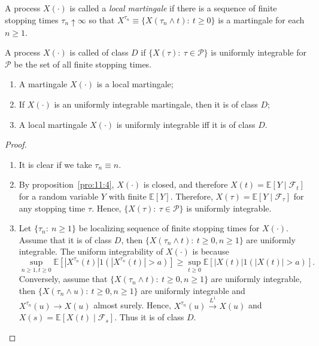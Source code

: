 \begin{definition}
A process $X(\cdot)$ is called a \emph{local martingale} if
there is a sequence of finite stopping times $\tau_n\uparrow \infty$ so that 
$X^{\tau_n}\equiv\{X(\tau_n\land t):~t\ge0\}$ is a martingale for each $n\ge1$.
\end{definition}

\begin{definition}[Class D]
A process $X(\cdot)$ is called of class $D$ if $\{X(\tau):~\tau\in\mathcal{P}\}$
is uniformly integrable for $\mathcal{P}$ be the set of all finite stopping times.
\end{definition}

\begin{proposition}
\begin{enumerate}
\item
A martingale $X(\cdot)$ is a local martingale;
\item
If $X(\cdot)$ is an uniformly integrable martingale, then it is of class $D$;
\item
A local martingale $X(\cdot)$ is uniformly integrable iff it is of class $D$.
\end{enumerate}
\end{proposition}
\begin{proof}
\begin{enumerate}
\item
It is clear if we take $\tau_n\equiv n$.
\item
By proposition~\ref{pro:11:4}, $X(\cdot)$ is closed, and therefore $X(t)=\mathbb{E}[Y\mid\mathcal{F}_t]$ for a random variable $Y$ with finite $\mathbb{E}[Y]$. 
Therefore, $X(\tau)=\mathbb{E}[Y\mid\mathcal{F}_{\tau}]$ for any stopping time $\tau$.
Hence, $\{X(\tau):~\tau\in\mathcal{P}\}$ is uniformly integrable.
\item
Let $\{\tau_n:~n\ge1\}$ be localizing sequence of finite stopping times for $X(\cdot)$.
Assume that it is of class $D$, then $\{X(\tau_n\land t):~t\ge0, n\ge1\}$ are uniformly integrable.
The uniform integrability of $X(\cdot)$ is because
\[
\sup_{n\ge1,t\ge0}\mathbb{E}[|X^{\tau_n}(t)|1(|X^{\tau_n}(t)|>a)]\ge
\sup_{t\ge0}\mathbb{E}[|X(t)|1(|X(t)|>a)].
\]
Conversely, assume that $\{X(\tau_n\land t):~t\ge0, n\ge1\}$ are uniformly integrable,
then $\{X(\tau_n\land u):~t\ge0, n\ge1\}$ are uniformly integrable and $X^{\tau_n}(u)\to X(u)$ almost surely. Hence, $X^{\tau_n}(u)\xrightarrow{L^1}X(u)$ and $X(s)=\mathbb{E}[X(t)\mid\mathcal{F}_s]$.
Thus it is of class $D$.
\end{enumerate}
\end{proof}

